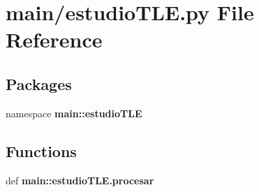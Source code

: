 \section{main/estudio\-T\-L\-E.py \-File \-Reference}
\label{estudio_t_l_e_8py}
\subsection*{\-Packages}
\begin{DoxyCompactItemize}
\item 
namespace {\bf main\-::estudio\-T\-L\-E}
\end{DoxyCompactItemize}
\subsection*{\-Functions}
\begin{DoxyCompactItemize}
\item 
def {\bf main\-::estudio\-T\-L\-E.\-procesar}
\end{DoxyCompactItemize}
